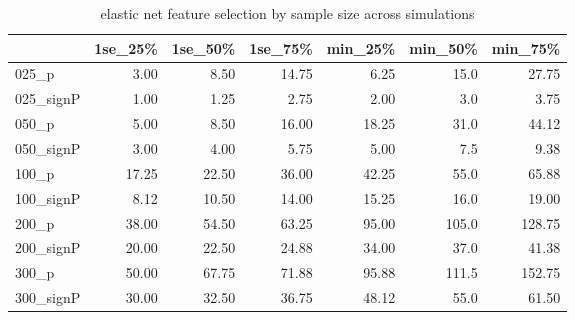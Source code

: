 \documentclass[
]{book}
\begin{document}
\begin{table}

\caption{\label{tab:hcc5hmC-glmnetSuiteB-print-enet-simRes-features-OverSim}elastic net feature selection by sample size across simulations}
\centering
\begin{tabular}[t]{l|r|r|r|r|r|r}
\hline
  & 1se\_25\% & 1se\_50\% & 1se\_75\% & min\_25\% & min\_50\% & min\_75\%\\
\hline
025\_p & 3.00 & 8.50 & 14.75 & 6.25 & 15.0 & 27.75\\
\hline
025\_signP & 1.00 & 1.25 & 2.75 & 2.00 & 3.0 & 3.75\\
\hline
050\_p & 5.00 & 8.50 & 16.00 & 18.25 & 31.0 & 44.12\\
\hline
050\_signP & 3.00 & 4.00 & 5.75 & 5.00 & 7.5 & 9.38\\
\hline
100\_p & 17.25 & 22.50 & 36.00 & 42.25 & 55.0 & 65.88\\
\hline
100\_signP & 8.12 & 10.50 & 14.00 & 15.25 & 16.0 & 19.00\\
\hline
200\_p & 38.00 & 54.50 & 63.25 & 95.00 & 105.0 & 128.75\\
\hline
200\_signP & 20.00 & 22.50 & 24.88 & 34.00 & 37.0 & 41.38\\
\hline
300\_p & 50.00 & 67.75 & 71.88 & 95.88 & 111.5 & 152.75\\
\hline
300\_signP & 30.00 & 32.50 & 36.75 & 48.12 & 55.0 & 61.50\\
\hline
\end{tabular}
\end{table}
\end{document}
